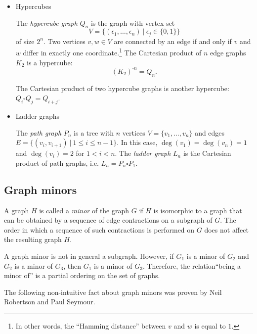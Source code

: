 \begin{itemize}
\item Hypercubes

The \emph{hypercube graph} $Q_n$ is the graph with vertex set
\[
V
=
\big\{ (\epsilon_1,\dots,\epsilon_n)\ |\ \epsilon_j \in \{0,1\} \big\}
\]
of size $2^n$. Two vertices $v,w \in V$ are connected by an edge if
and only if $v$ and $w$ differ in exactly one
coordinate.\footnote{
In other words, the ``Hamming distance'' between $v$ and $w$ is equal
to $1$.}
The Cartesian product of $n$ edge graphs $K_2$ is a hypercube:
\[
(K_2)^{\square n} = Q_n.
\]

\begin{example}
The Cartesian product of two hypercube graphs is another
hypercube: $Q_i \square Q_j = Q_{i+j}$.
\end{example}


\item Ladder graphs

The \emph{path graph} $P_n$ is a tree with $n$ vertices
$V = \{ v_1,\dots, v_n \}$ and edges
$E = \{ (v_i, v_{i+1})\ |\ 1 \leq i \leq n-1 \}$. In this case,
$\deg(v_1) = \deg(v_n) = 1$ and $\deg(v_i) = 2$ for $1 < i < n$.
The \emph{ladder graph} $L_n$ is the Cartesian product of path
graphs, i.e. $L_n = P_n \square P_1$.
\end{itemize}

\subsection{Graph minors}

A graph $H$ is called a {\it minor} of the graph $G$ if $H$ is isomorphic to a
graph that can be obtained by a sequence of edge contractions on a
subgraph of $G$.  The order in which a sequence of such contractions is
performed on $G$ does not affect the resulting graph $H$.

A graph minor is not in general a subgraph.
However, if $G_1$
is a minor of $G_2$ and $G_2$ is a minor of $G_3$, then $G_1$ is a minor of $G_3$.
Therefore, the relation``being a minor of'' is a partial ordering on
the set of graphs.

The following non-intuitive fact about graph minors was proven by
Neil Robertson and Paul Seymour.


